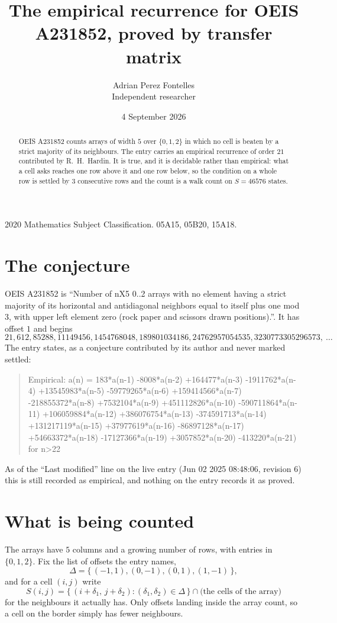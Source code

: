 \documentclass[11pt,a4paper]{article}
\title{The empirical recurrence for OEIS A231852, proved by transfer matrix}
\author{Adrian Perez Fontelles\\ \small Independent researcher}
\date{4 September 2026}
\theoremstyle{plain}
\theoremstyle{definition}
\begin{document}
\maketitle

\begin{abstract}
OEIS A231852 counts arrays of width $5$ over $\{0,1,2\}$ in which no cell is beaten by a strict majority of its neighbours. The entry carries an
empirical recurrence of order $21$ contributed by R.~H.~Hardin. It is true, and it is
decidable rather than empirical: what a cell asks reaches one row above
it and one row below, so the condition on a whole row is settled by
$3$ consecutive rows and the count is a walk count on $S=46576$ states.
\end{abstract}

\noindent\small 2020 Mathematics Subject Classification. 05A15, 05B20, 15A18.\normalsize

\section{The conjecture}

OEIS A231852 is ``Number of nX5 0..2 arrays with no element having a strict majority of its horizontal and antidiagonal neighbors equal to itself plus one mod 3, with upper left element zero (rock paper and scissors drawn positions).''. It has offset $1$ and begins
\[
21, 612, 85288, 11149456, 1454768048, 189801034186, 24762957054535, 3230773305296573,\ \dots
\]
The entry states, as a conjecture contributed by its author and never marked settled:
\begin{quote}
Empirical: a(n) = 183*a(n-1) -8008*a(n-2) +164477*a(n-3) -1911762*a(n-4) +13545983*a(n-5) -59779265*a(n-6) +159414566*a(n-7) -218855372*a(n-8) +7532104*a(n-9) +451112826*a(n-10) -590711864*a(n-11) +106059884*a(n-12) +386076754*a(n-13) -374591713*a(n-14) +131217119*a(n-15) +37977619*a(n-16) -86897128*a(n-17) +54663372*a(n-18) -17127366*a(n-19) +3057852*a(n-20) -413220*a(n-21) for n>22
\end{quote}
As of the ``Last modified'' line on the live entry (Jun 02 2025 08:48:06, revision 6) this is still
recorded as empirical, and nothing on the entry records it as proved.

\section{What is being counted}

The arrays have $5$ columns and a growing number of rows, with entries in $\{0,1,2\}$. Fix the
list of offsets the entry names,
\[
\Delta=\{\,(-1,1), (0,-1), (0,1), (1,-1)\,\},
\]
and for a cell $(i,j)$ write
\[
S(i,j)=\{\,(i+\delta_1,\,j+\delta_2) : (\delta_1,\delta_2)\in\Delta\,\}\cap
\text{(the cells of the array)}
\]
for the neighbours it actually has. Only offsets landing inside the array count, so a cell on
the border simply has fewer neighbours.
\end{document}
